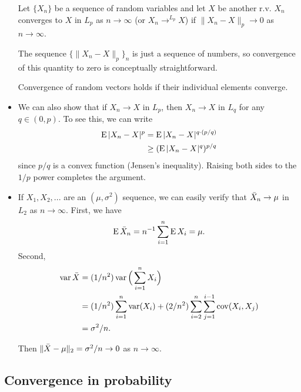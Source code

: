 \begin{itemize}
  \begin{defn}
    Let $\{X_n\}$ be a sequence of random variables and let $X$ be
    another r.v.  $X_n$ converges to $X$ in $L_p$ as $n \to \infty$ (or $X_n
    \to^{L_p} X$) if $\lVert X_n - X \rVert_p \to 0$ as $n \to \infty$.
  \end{defn}
  The sequence $\{\lVert X_n - X \rVert_p\}_n$ is just a sequence of
  numbers, so convergence of this quantity to zero is conceptually
  straightforward.

  Convergence of random vectors holds if their individual elements
  converge.

\item We can also show that if $X_n \to X$ in $L_p$, then $X_n \to X$ in
  $L_q$ for any $q \in (0, p)$.  To see this, we can write
  \begin{align*}
    \operatorname{E} | X_n - X |^p
    &= \operatorname{E} | X_n - X |^{q \cdot (p/q)} \\
    &\geq (\operatorname{E} | X_n - X |^{q})^{p/q}
  \end{align*}
  since $p/q$ is a convex function (Jensen's inequality).  Raising
  both sides to the $1/p$ power completes the argument.

\item If $X_1, X_2,...$ are an \iid$(\mu, \sigma^2)$ sequence, we can easily
  verify that $\bar{X}_n \to \mu$ in $L_2$ as $n \to \infty$.  First, we have
  \begin{equation*}
    \operatorname{E} \bar{X}_n = n^{-1} \sum_{i=1}^n \operatorname{E} X_i = \mu.
  \end{equation*}
  Second,
  \begin{align*}
    \operatorname{var} \bar{X} &= (1/n^2) \operatorname{var}\Big( \sum_{i=1}^n X_i \Big)\\
    &= (1/n^2) \sum_{i=1}^n \operatorname{var}(X_i) + (2/n^2) \sum_{i=2}^n \sum_{j=1}^{i-1} \operatorname{cov}(X_i, X_j) \\
    &= \sigma^2 / n.
  \end{align*}
  
  Then $\lVert \bar{X} - \mu \rVert_2 = \sigma^2/n \to 0$ as $n \to \infty$.
  
\end{itemize}

\subsection{Convergence in probability}

